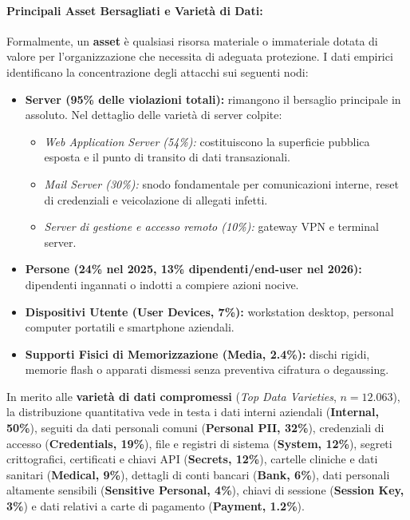 \documentclass[../../main.tex]{subfiles}
\begin{document}
\paragraph{Principali Asset Bersagliati e Varietà di Dati:}
Formalmente, un \textbf{asset} è qualsiasi risorsa materiale o immateriale dotata di valore per l'organizzazione che necessita di adeguata protezione. I dati empirici identificano la concentrazione degli attacchi sui seguenti nodi:
\begin{itemize}
    \item \textbf{Server (95\% delle violazioni totali):} rimangono il bersaglio principale in assoluto. Nel dettaglio delle varietà di server colpite:
    \begin{itemize}
        \item \textit{Web Application Server (54\%):} costituiscono la superficie pubblica esposta e il punto di transito di dati transazionali.
        \item \textit{Mail Server (30\%):} snodo fondamentale per comunicazioni interne, reset di credenziali e veicolazione di allegati infetti.
        \item \textit{Server di gestione e accesso remoto (10\%):} gateway VPN e terminal server.
    \end{itemize}
    \item \textbf{Persone (24\% nel 2025, 13\% dipendenti/end-user nel 2026):} dipendenti ingannati o indotti a compiere azioni nocive.
    \item \textbf{Dispositivi Utente (User Devices, 7\%):} workstation desktop, personal computer portatili e smartphone aziendali.
    \item \textbf{Supporti Fisici di Memorizzazione (Media, 2.4\%):} dischi rigidi, memorie flash o apparati dismessi senza preventiva cifratura o degaussing.
\end{itemize}

In merito alle \textbf{varietà di dati compromessi} (\textit{Top Data Varieties}, $n=12.063$), la distribuzione quantitativa vede in testa i dati interni aziendali (\textbf{Internal, 50\%}), seguiti da dati personali comuni (\textbf{Personal PII, 32\%}), credenziali di accesso (\textbf{Credentials, 19\%}), file e registri di sistema (\textbf{System, 12\%}), segreti crittografici, certificati e chiavi API (\textbf{Secrets, 12\%}), cartelle cliniche e dati sanitari (\textbf{Medical, 9\%}), dettagli di conti bancari (\textbf{Bank, 6\%}), dati personali altamente sensibili (\textbf{Sensitive Personal, 4\%}), chiavi di sessione (\textbf{Session Key, 3\%}) e dati relativi a carte di pagamento (\textbf{Payment, 1.2\%}).
\end{document}
